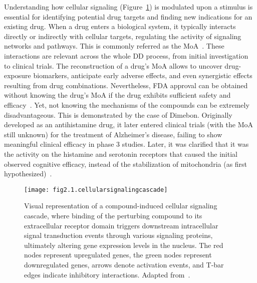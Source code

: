 Understanding how cellular signaling (Figure~\ref{fig:fig2.1.cellularsignalingcascade}) is modulated upon a stimulus is essential for identifying potential drug targets and finding new indications for an existing drug. 
When a drug enters a biological system, it typically interacts directly or indirectly with cellular targets, regulating the activity of signaling networks and pathways. 
This is commonly referred as the \gls{MoA}~\cite{RN52, RN53}. These interactions are relevant across the whole \gls{DD} process, from initial investigation to clinical trials.
The reconstruction of a drug's \gls{MoA} allows to uncover drug-exposure biomarkers, anticipate early adverse effects, and even synergistic effects resulting from drug combinations. 
Nevertheless, FDA approval can be obtained without knowing the drug's \gls{MoA} if the drug exhibits sufficient safety and efficacy~\cite{RN38, RN68}. 
Yet, not knowing the mechanisms of the compounds can be extremely disadvantageous. This is demonstrated by the case of Dimebon. 
Originally developed as an antihistamine drug, it later entered clinical trials (with the \gls{MoA} still unknown) for the treatment of Alzheimer's disease, failing to show meaningful clinical efficacy in phase 3 studies. 
Later, it was clarified that it was the activity on the histamine and serotonin receptors that caused the initial observed cognitive efficacy, instead of the stabilization of mitochondria (as first hypothesized)~\cite{RN38, RN69}.

\begin{figure}[htbp]
    \centering
    \texttt{[image: fig2.1.cellularsignalingcascade]}
    \caption[Visual representation of a compound-induced cellular signaling cascade.]{Visual representation of a compound-induced cellular signaling cascade, where binding of the perturbing compound to its extracellular receptor domain triggers downstream intracellular signal transduction events through various signaling proteins, ultimately altering gene expression levels in the nucleus. The red nodes represent upregulated genes, the green nodes represent downregulated genes, arrows denote activation events, and T-bar edges indicate inhibitory interactions. Adapted from~\cite{RN31}.}
    \label{fig:fig2.1.cellularsignalingcascade}
\end{figure}

